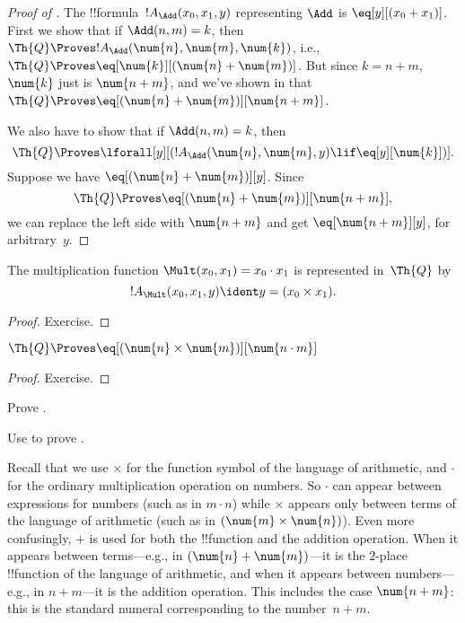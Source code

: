 \documentclass[../../../include/open-logic-section]{subfiles}
\begin{document}
\begin{proof}[Proof of ]
The !!{formula}~$!A_\Add(x_0, x_1, y)$ representing $\Add$ is
$\eq[y][(x_0 + x_1)]$. First we show that if $\Add(n, m) = k$, then
$\Th{Q} \Proves !A_\Add(\num{n}, \num{m}, \num{k})$, i.e., $\Th{Q}
\Proves \eq[\num{k}][(\num{n} + \num{m})]$. But since $k = n + m$,
$\num{k}$ just is $\num{n+m}$, and we've shown in
 that $\Th{Q} \Proves \eq[(\num{n} +
  \num{m})][\num{n+m}]$.

We also have to show that if $\Add(n, m) = k$, then
\[
\Th{Q} \Proves \lforall[y][(!A_\Add(\num{n}, \num{m}, y) \lif
  \eq[y][\num{k}])].
\]
Suppose we have $\eq[(\num{n} + \num{m})][y]$. Since
\[
\Th{Q} \Proves \eq[(\num{n}+\num{m})][\num{n+m}],
\]
we can replace the left side with $\num{n+m}$ and get
$\eq[\num{n+m}][y]$, for arbitrary~$y$.
\end{proof}

\begin{prop}
The multiplication function $\Mult(x_0, x_1) = x_0 \cdot x_1$ is represented
in~$\Th{Q}$ by
\[
  !A_{\Mult}(x_0, x_1, y) \ident y = (x_0 \times x_1).
\]
\end{prop}

\begin{proof} Exercise. \end{proof}

\begin{lem}
$\Th{Q} \Proves \eq[(\num{n} \times \num{m})][\num{n \cdot m}]$
\end{lem}

\begin{proof} Exercise. \end{proof}

\begin{prob}
Prove .
\end{prob}

\begin{prob}
Use  to prove
.
\end{prob}

\begin{explain}
  Recall that we use $\times$ for the function symbol of the language
  of arithmetic, and $\cdot$ for the ordinary multiplication operation
  on numbers. So $\cdot$ can appear between expressions for numbers
  (such as in $m \cdot n$) while $\times$ appears only between terms
  of the language of arithmetic (such as in $(\num{m} \times
  \num{n})$).  Even more confusingly, $+$ is used for both the
  !!{function} and the addition operation. When it appears between
  terms---e.g., in $(\num{n} + \num{m})$---it is the $2$-place
  !!{function} of the language of arithmetic, and when it appears
  between numbers---e.g., in $n+m$---it is the addition operation.
  This includes the case $\num{n+m}$: this is the standard numeral
  corresponding to the number~$n+m$.
\end{explain}
\end{document}
